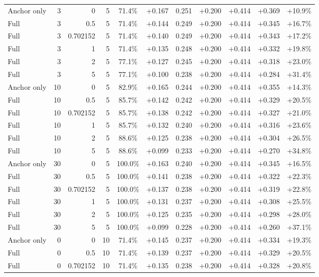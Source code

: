 \begin{table}[htbp]
\begin{tabular}{lrrrccccccc}
Anchor only & 3 & 0 & 5 & 71.4\% & +0.167 & 0.251 & +0.200 & +0.414 & +0.369 & +10.9\% \\
Full & 3 & 0.5 & 5 & 71.4\% & +0.144 & 0.249 & +0.200 & +0.414 & +0.345 & +16.7\% \\
Full & 3 & 0.702152 & 5 & 71.4\% & +0.140 & 0.249 & +0.200 & +0.414 & +0.343 & +17.2\% \\
Full & 3 & 1 & 5 & 71.4\% & +0.135 & 0.248 & +0.200 & +0.414 & +0.332 & +19.8\% \\
Full & 3 & 2 & 5 & 77.1\% & +0.127 & 0.245 & +0.200 & +0.414 & +0.318 & +23.0\% \\
Full & 3 & 5 & 5 & 77.1\% & +0.100 & 0.238 & +0.200 & +0.414 & +0.284 & +31.4\% \\
Anchor only & 10 & 0 & 5 & 82.9\% & +0.165 & 0.244 & +0.200 & +0.414 & +0.355 & +14.3\% \\
Full & 10 & 0.5 & 5 & 85.7\% & +0.142 & 0.242 & +0.200 & +0.414 & +0.329 & +20.5\% \\
Full & 10 & 0.702152 & 5 & 85.7\% & +0.138 & 0.242 & +0.200 & +0.414 & +0.327 & +21.0\% \\
Full & 10 & 1 & 5 & 85.7\% & +0.132 & 0.240 & +0.200 & +0.414 & +0.316 & +23.6\% \\
Full & 10 & 2 & 5 & 88.6\% & +0.125 & 0.238 & +0.200 & +0.414 & +0.304 & +26.5\% \\
Full & 10 & 5 & 5 & 88.6\% & +0.099 & 0.233 & +0.200 & +0.414 & +0.270 & +34.8\% \\
Anchor only & 30 & 0 & 5 & 100.0\% & +0.163 & 0.240 & +0.200 & +0.414 & +0.345 & +16.5\% \\
Full & 30 & 0.5 & 5 & 100.0\% & +0.141 & 0.238 & +0.200 & +0.414 & +0.322 & +22.3\% \\
Full & 30 & 0.702152 & 5 & 100.0\% & +0.137 & 0.238 & +0.200 & +0.414 & +0.319 & +22.8\% \\
Full & 30 & 1 & 5 & 100.0\% & +0.131 & 0.237 & +0.200 & +0.414 & +0.308 & +25.5\% \\
Full & 30 & 2 & 5 & 100.0\% & +0.125 & 0.235 & +0.200 & +0.414 & +0.298 & +28.0\% \\
Full & 30 & 5 & 5 & 100.0\% & +0.099 & 0.228 & +0.200 & +0.414 & +0.260 & +37.1\% \\
Anchor only & 0 & 0 & 10 & 71.4\% & +0.145 & 0.237 & +0.200 & +0.414 & +0.334 & +19.3\% \\
Full & 0 & 0.5 & 10 & 71.4\% & +0.139 & 0.237 & +0.200 & +0.414 & +0.329 & +20.5\% \\
Full & 0 & 0.702152 & 10 & 71.4\% & +0.135 & 0.238 & +0.200 & +0.414 & +0.328 & +20.8\% \\

\end{tabular}
\end{table}
